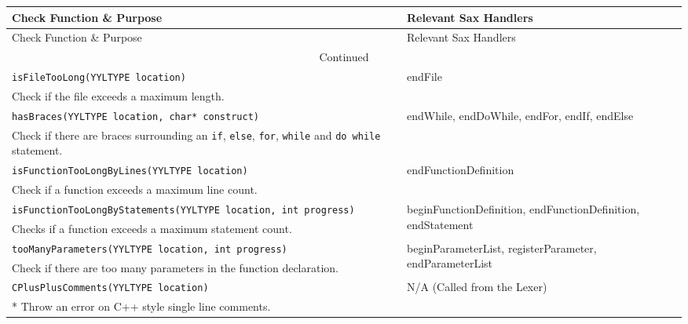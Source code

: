 \documentclass[12pt]{report}
\begin{document}
\begin{longtable}{p{10cm} p{\saxColSize}}
\toprule
Check Function \& Purpose & Relevant Sax Handlers \\ \midrule
\endfirsthead
\toprule
Check Function \& Purpose & Relevant Sax Handlers \\ \midrule
\endhead
\hline
\multicolumn{2}{c}{Continued}\\
\bottomrule
\endfoot
\bottomrule
\endlastfoot

		\lstinline!isFileTooLong(YYLTYPE location)! & \multirow{2}{\saxColSize}{endFile} \\*
			 Check if the file exceeds a maximum length.  \vspace{\vertSize} \\
		\lstinline!hasBraces(YYLTYPE location, char* construct)! & \multirow{2}{\saxColSize}{endWhile, endDoWhile, endFor, endIf, endElse} \\*
			 Check if there are braces surrounding an \lstinline!if!, \lstinline!else!, \lstinline!for!, \lstinline!while! and \lstinline!do while! statement. \vspace{\vertSize} \\
		\lstinline!isFunctionTooLongByLines(YYLTYPE location)! & \multirow{2}{\saxColSize}{endFunctionDefinition} \\*
			 Check if a function exceeds a maximum line count. \vspace{\vertSize} \\
		\lstinline!isFunctionTooLongByStatements(YYLTYPE location, int progress)! & \multirow{2}{\saxColSize}{beginFunctionDefinition, endFunctionDefinition, endStatement} \\*
			 Checks if a function exceeds a maximum statement count. \vspace{\vertSize} \\
		\lstinline!tooManyParameters(YYLTYPE location, int progress)! & \multirow{2}{\saxColSize}{beginParameterList, registerParameter, endParameterList} \\*
			 Check if there are too many parameters in the function declaration. \vspace{\vertSize} \\
		\lstinline!CPlusPlusComments(YYLTYPE location)! & \multirow{2}{\saxColSize}{N/A (Called from the Lexer)} \\ *
		Throw an error on C++ style single line comments. \vspace{\vertSize} \\

\end{longtable}
\end{document}
